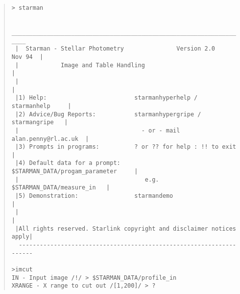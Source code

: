 {\footnotesize
\begin{quote}
\begin{tabbing} %
\verb#> starman                                                                    # \\
\verb#                                                                        #\\
\verb#  ____________________________________________________________________  #\\
\verb# |  Starman - Stellar Photometry               Version 2.0    Nov 94  | #\\
\verb# |            Image and Table Handling                                | #\\
\verb# |                                                                    | #\\
\verb# |1) Help:                         starmanhyperhelp / starmanhelp     | #\\
\verb# |2) Advice/Bug Reports:           starmanhypergripe / starmangripe   | #\\
\verb# |                                   - or - mail alan.penny@rl.ac.uk  | #\\
\verb# |3) Prompts in programs:          ? or ?? for help : !! to exit      | #\\
\verb# |4) Default data for a prompt:    $STARMAN_DATA/progam_parameter     | #\\
\verb# |                                    e.g. $STARMAN_DATA/measure_in   | #\\
\verb# |5) Demonstration:                starmandemo                        | #\\
\verb# |                                                                    | #\\
\verb# |All rights reserved. Starlink copyright and disclaimer notices apply| #\\
\verb#  --------------------------------------------------------------------  #\\
\verb#                                                             #\\
\verb#>imcut                                                                       # \\
\verb#IN - Input image /!/ > $STARMAN_DATA/profile_in                              # \\
\verb#XRANGE - X range to cut out /[1,200]/ > ?                                    # \\

\end{tabbing}
\end{quote}}
